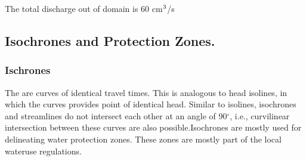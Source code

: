 \documentclass[letterpaper,10pt,english]{sphinxmanual}
\begin{document}
\begin{sphinxVerbatim}[commandchars=\\\{\}]

   
   
   
   
   
   

  

   

 
\end{sphinxVerbatim}

\begin{sphinxVerbatim}[commandchars=\\\{\}]
The total discharge out of domain is 60 cm\(\sp{\text{3}}\)/s
\end{sphinxVerbatim}


\subsection{Isochrones and Protection Zones.}
\label{\detokenize{contents/flow/lecture_06/16_darcy_law_3D:isochrones-and-protection-zones}}

\subsubsection{Ischrones}
\label{\detokenize{contents/flow/lecture_06/16_darcy_law_3D:ischrones}}
The  are curves of identical travel times. This is analogous to head isolines, in which the curves provides point of identical head. Similar to isolines, isochrones and streamlines do not  intersect each other at an angle of 90\(^\circ\), i.e., curvilinear intersection between these curves are also possible.Isochrones are mostly used for delineating water protection zones. These zones are mostly part of the local water\sphinxhyphen{}use regulations.
\end{document}

